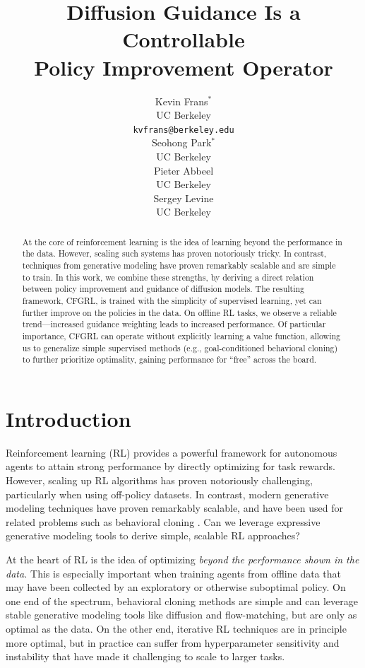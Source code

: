 \documentclass{article}
\title{Diffusion Guidance Is a Controllable \\ Policy Improvement Operator}
\author{Kevin Frans$^*$ \\
  UC Berkeley\\
  \texttt{kvfrans@berkeley.edu} \\
  \And
  Seohong Park$^*$ \\
  UC Berkeley \\
  \And
  Pieter Abbeel \\
  UC Berkeley \\
  \And
  Sergey Levine \\
  UC Berkeley \\
}
\begin{document}
\maketitle


\begin{abstract}
  At the core of reinforcement learning is the idea of learning beyond the performance in the data. However, scaling such systems has proven notoriously tricky. In contrast, techniques from generative modeling have proven remarkably scalable and are simple to train. 
  In this work, we combine these strengths, by deriving a direct relation between policy improvement and guidance of diffusion models. The resulting framework, CFGRL, is trained with the simplicity of supervised learning, yet can further improve on the policies in the data.
  On offline RL tasks, we observe a reliable trend---increased guidance weighting leads to increased performance. Of particular importance, CFGRL can operate without explicitly learning a value function, allowing us to generalize simple supervised methods (e.g., goal-conditioned behavioral cloning) to further prioritize optimality, gaining performance for ``free'' across the board.
\end{abstract}


\section{Introduction}

\def\thefootnote{*}\def\thefootnote{\arabic{footnote}}

Reinforcement learning (RL) provides a powerful framework for autonomous agents to attain strong performance by directly optimizing for task rewards. However, scaling up RL algorithms has proven notoriously challenging, particularly when using off-policy datasets. In contrast, modern generative modeling techniques have proven remarkably scalable, and have been used for related problems such as behavioral cloning \citep{diffuser_janner2022, pi0_black2024, diffusionpolicy_chi2023}. Can we leverage expressive generative modeling tools to derive simple, scalable RL approaches?

At the heart of RL is the idea of optimizing \textit{beyond the performance shown in the data.} This is especially important when training agents from offline data that may have been collected by an exploratory or otherwise suboptimal policy. On one end of the spectrum, behavioral cloning methods are simple and can leverage stable generative modeling tools like diffusion \cite{ddpm_ho2020, lipman2024flow} and flow-matching, but are only as optimal as the data. On the other end, iterative RL techniques are in principle more optimal, but in practice can suffer from hyperparameter sensitivity and instability \citep{bottleneck_park2024, cql_kumar2020, td3_fujimoto2018} that have made it challenging to scale to larger tasks.
\end{document}
